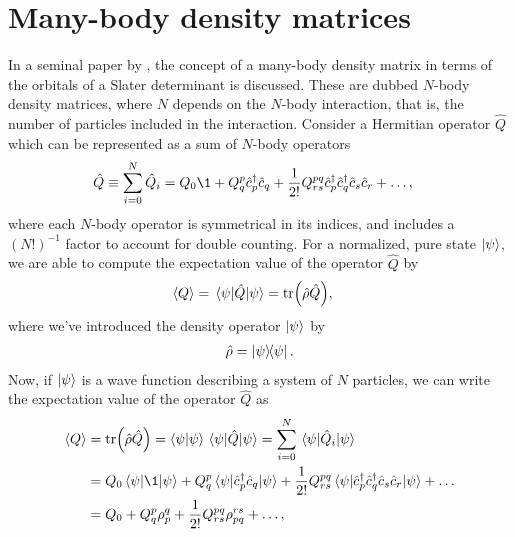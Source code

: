     \section{Many-body density matrices}
        In a seminal paper by \citeauthor{lowdin-density-matrices}
        \cite{lowdin-density-matrices}, the concept of a many-body density
        matrix in terms of the orbitals of a Slater determinant is discussed.
        These are dubbed $N$-body density matrices, where $N$ depends on the
        $N$-body interaction, that is, the number of particles included in the
        interaction.
        Consider a Hermitian operator $\hat{Q}$ which can be represented as a
        sum of $N$-body operators
        \begin{align}
            \hat{Q}
            &\equiv
            \sum_{i = 0}^{N} \hat{Q}_i
            = Q_0\1 + Q^{p}_{q}\ccr{p}\can{q}
            + \frac{1}{2!}Q^{pq}_{rs}\ccr{p}\ccr{q}\can{s}\can{r}
            + \dots,
        \end{align}
        where each $N$-body operator is symmetrical in its indices, and includes
        a $(N!)^{-1}$ factor to account for double counting.
        For a normalized, pure state $\ket{\psi}$, we are able to compute the
        expectation value of the operator $\hat{Q}$ by
        \begin{align}
            \left\langle Q \right\rangle &= \mel{\psi}{\hat{Q}}{\psi}
            = \tr(\hat{\rho} \hat{Q}),
        \end{align}
        where we've introduced the density operator $\ket{\psi}$ by
        \begin{align}
            \density = \dyad{\psi}{\psi}.
        \end{align}
        Now, if $\ket{\psi}$ is a wave function describing a system of $N$
        particles, we can write the expectation value of the operator $\hat{Q}$
        as
        \begin{align}
            \expv{Q}
            &= \tr(\density \hat{Q})
            = \braket{\psi}\mel{\psi}{\hat{Q}}{\psi}
            = \sum_{i = 0}^{N} \mel{\psi}{\hat{Q}_i}{\psi}
            \\
            &=
            Q_0 \mel{\psi}{\1}{\psi}
            + Q^{p}_{q}\mel{\psi}{\ccr{p}\can{q}}{\psi}
            + \frac{1}{2!}
            Q^{pq}_{rs}
            \mel{\psi}{\ccr{p}\ccr{q}\can{s}\can{r}}{\psi}
            + \dots
            \\
            &= Q_0 + Q^{p}_{q}\densityten^{q}_{p}
            + \frac{1}{2!} Q^{pq}_{rs} \densityten^{rs}_{pq}
            + \dots,
        \end{align}
